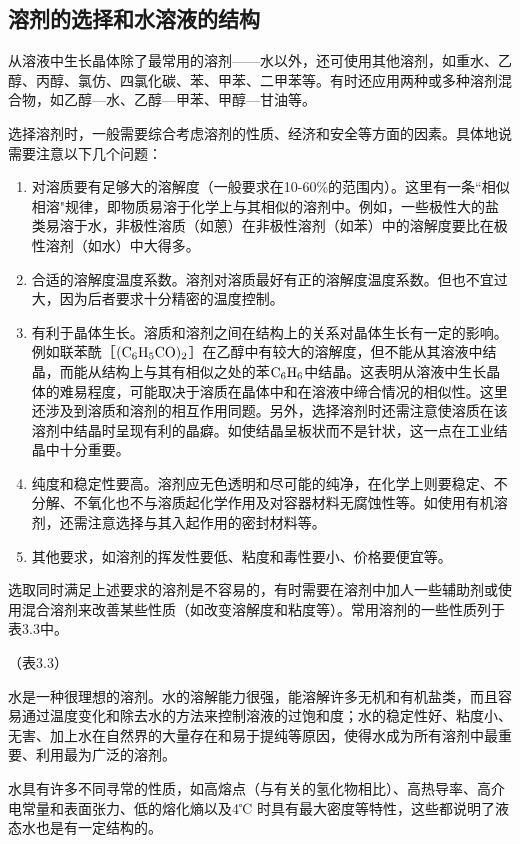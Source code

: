 ﻿\subsection{溶剂的选择和水溶液的结构}
从溶液中生长晶体除了最常用的溶剂——水以外，还可使用其他溶剂，如重水、乙醇、丙醇、氯仿、四氯化碳、苯、甲苯、二甲苯等。有时还应用两种或多种溶剂混合物，如乙醇—水、乙醇—甲苯、甲醇—甘油等。

选择溶剂时，一般需要综合考虑溶剂的性质、经济和安全等方面的因素。具体地说需要注意以下几个问题：
\begin{enumerate}[(1)]\itemsep -0.5ex
\item 对溶质要有足够大的溶解度（一般要求在10-60\%的范围内）。这里有一条“相似相溶"规律，即物质易溶于化学上与其相似的溶剂中。例如，一些极性大的盐类易溶于水，非极性溶质（如蒽）在非极性溶剂（如苯）中的溶解度要比在极性溶剂（如水）中大得多。
\item 合适的溶解度温度系数。溶剂对溶质最好有正的溶解度温度系数。但也不宜过大，因为后者要求十分精密的温度控制。
\item 有利于晶体生长。溶质和溶剂之间在结构上的关系对晶体生长有一定的影响。例如联苯酰［$\rm (C_6H_5CO)_2$］在乙醇中有较大的溶解度，但不能从其溶液中结晶，而能从结构上与其有相似之处的苯$\rm C_6H_6$中结晶。这表明从溶液中生长晶体的难易程度，可能取决于溶质在晶体中和在溶液中缔合情况的相似性。这里还涉及到溶质和溶剂的相互作用同题。另外，选择溶剂时还需注意使溶质在该溶剂中结晶时呈现有利的晶癖。如使结晶呈板状而不是针状，这一点在工业结晶中十分重要。
\item 纯度和稳定性要高。溶剂应无色透明和尽可能的纯净，在化学上则要稳定、不分解、不氧化也不与溶质起化学作用及对容器材料无腐蚀性等。如使用有机溶剂，还需注意选择与其入起作用的密封材料等。
\item 其他要求，如溶剂的挥发性要低、粘度和毒性要小、价格要便宜等。
\end{enumerate}

选取同时满足上述要求的溶剂是不容易的，有时需要在溶剂中加人一些辅助剂或使用混合溶剂来改善某些性质（如改变溶解度和粘度等）。常用溶剂的一些性质列于表3.3中。

（表3.3）

水是一种很理想的溶剂。水的溶解能力很强，能溶解许多无机和有机盐类，而且容易通过温度变化和除去水的方法来控制溶液的过饱和度；水的稳定性好、粘度小、无害、加上水在自然界的大量存在和易于提纯等原因，使得水成为所有溶剂中最重要、利用最为广泛的溶剂。

水具有许多不同寻常的性质，如高熔点（与有关的氢化物相比）、高热导率、高介电常量和表面张力、低的熔化熵以及4℃ 时具有最大密度等特性，这些都说明了液态水也是有一定结构的。

